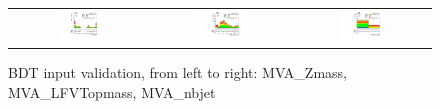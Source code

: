\begin{figure}[tbh!]
 \begin{center}
 \begin{tabular}{ccc}
  \includegraphics[width=0.325\textwidth]{figures/Part3/BDT/Zmass}&
    \includegraphics[width=0.325\textwidth]{figures/Part3/BDT/LFVTopmass}&
  \includegraphics[width=0.325\textwidth]{figures/Part3/BDT/nbjet}\\
 \end{tabular}
 \caption{BDT input validation, from left to right: MVA\_Zmass, MVA\_LFVTopmass, MVA\_nbjet}
 \label{fig:input_vali_2}
 \end{center}
\end{figure}

